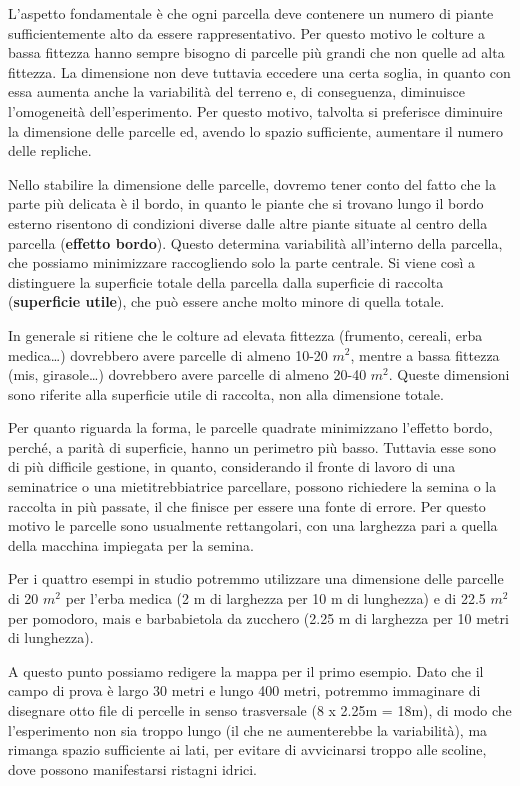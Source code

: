 \documentclass[a4paper,12pt,oneside]{book}
\begin{document}
L'aspetto fondamentale è che ogni parcella deve contenere un numero di
piante sufficientemente alto da essere rappresentativo. Per questo
motivo le colture a bassa fittezza hanno sempre bisogno di parcelle più
grandi che non quelle ad alta fittezza. La dimensione non deve tuttavia
eccedere una certa soglia, in quanto con essa aumenta anche la
variabilità del terreno e, di conseguenza, diminuisce l'omogeneità
dell'esperimento. Per questo motivo, talvolta si preferisce diminuire la
dimensione delle parcelle ed, avendo lo spazio sufficiente, aumentare il
numero delle repliche.

Nello stabilire la dimensione delle parcelle, dovremo tener conto del
fatto che la parte più delicata è il bordo, in quanto le piante che si
trovano lungo il bordo esterno risentono di condizioni diverse dalle
altre piante situate al centro della parcella (\textbf{effetto bordo}).
Questo determina variabilità all'interno della parcella, che possiamo
minimizzare raccogliendo solo la parte centrale. Si viene così a
distinguere la superficie totale della parcella dalla superficie di
raccolta (\textbf{superficie utile}), che può essere anche molto minore
di quella totale.

In generale si ritiene che le colture ad elevata fittezza (frumento,
cereali, erba medica\ldots{}) dovrebbero avere parcelle di almeno 10-20
\(m^2\), mentre a bassa fittezza (mis, girasole\ldots{}) dovrebbero
avere parcelle di almeno 20-40 \(m^2\). Queste dimensioni sono riferite
alla superficie utile di raccolta, non alla dimensione totale.

Per quanto riguarda la forma, le parcelle quadrate minimizzano l'effetto
bordo, perché, a parità di superficie, hanno un perimetro più basso.
Tuttavia esse sono di più difficile gestione, in quanto, considerando il
fronte di lavoro di una seminatrice o una mietitrebbiatrice parcellare,
possono richiedere la semina o la raccolta in più passate, il che
finisce per essere una fonte di errore. Per questo motivo le parcelle
sono usualmente rettangolari, con una larghezza pari a quella della
macchina impiegata per la semina.

Per i quattro esempi in studio potremmo utilizzare una dimensione delle
parcelle di 20 \(m^2\) per l'erba medica (2 m di larghezza per 10 m di
lunghezza) e di 22.5 \(m^2\) per pomodoro, mais e barbabietola da
zucchero (2.25 m di larghezza per 10 metri di lunghezza).

A questo punto possiamo redigere la mappa per il primo esempio. Dato che
il campo di prova è largo 30 metri e lungo 400 metri, potremmo
immaginare di disegnare otto file di percelle in senso trasversale (8 x
2.25m = 18m), di modo che l'esperimento non sia troppo lungo (il che ne
aumenterebbe la variabilità), ma rimanga spazio sufficiente ai lati, per
evitare di avvicinarsi troppo alle scoline, dove possono manifestarsi
ristagni idrici.
\end{document}
